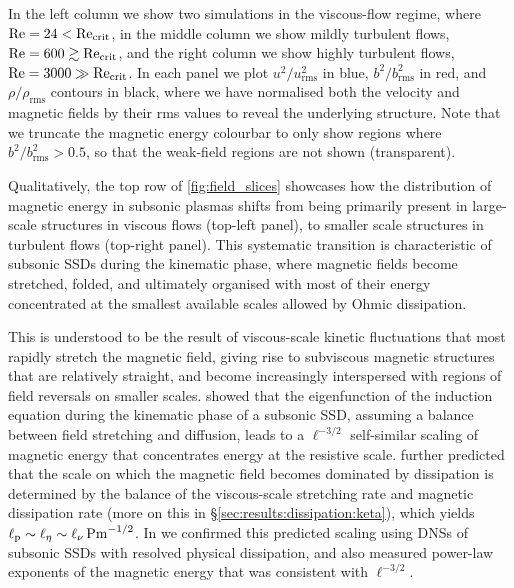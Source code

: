 In the left column we show two simulations in the viscous-flow regime, where $\mathrm{Re} = 24 < \mathrm{Re}_\mathrm{crit}$, in the middle column we show mildly turbulent flows, $\mathrm{Re} = 600 \gtrsim \mathrm{Re}_\mathrm{crit}$, and the right column we show highly turbulent flows, $\mathrm{Re} = 3000 \gg \mathrm{Re}_\mathrm{crit}$. In each panel we plot $u^2 / u_\mathrm{rms}^2$ in blue, $b^2/b_\mathrm{rms}^2$ in red, and $\rho/\rho_\mathrm{rms}$ contours in black, where we have normalised both the velocity and magnetic fields by their rms values to reveal the underlying structure. Note that we truncate the magnetic energy colourbar to only show regions where $b^2/b_\mathrm{rms}^2 > 0.5$, so that the weak-field regions are not shown (\ie transparent).

Qualitatively, the top row of \autoref{fig:field_slices} showcases how the distribution of magnetic energy in subsonic plasmas shifts from being primarily present in large-scale structures in viscous flows (top-left panel), to smaller scale structures in turbulent flows (top-right panel). This systematic transition is characteristic of subsonic SSDs during the kinematic phase, where magnetic fields become stretched, folded, and ultimately organised with most of their energy concentrated at the smallest available scales allowed by Ohmic dissipation.

This is understood to be the result of viscous-scale kinetic fluctuations that most rapidly stretch the magnetic field, giving rise to subviscous magnetic structures that are relatively straight, and become increasingly interspersed with regions of field reversals on smaller scales. \citet{kazantsev1968} showed that the eigenfunction of the induction equation during the kinematic phase of a subsonic SSD, assuming a balance between field stretching and diffusion, leads to a $\ell^{-3/2}$ self-similar scaling of magnetic energy that concentrates energy at the resistive scale. \citet{schekochihin2004simulations} further predicted that the scale on which the magnetic field becomes dominated by dissipation is determined by the balance of the viscous-scale stretching rate and magnetic dissipation rate (more on this in \S\ref{sec:results:dissipation:keta}), which yields $\ell_\mathrm{p} \sim \ell_\eta \sim \ell_\nu \,\mathrm{Pm}^{-1/2}$. In  we confirmed this predicted scaling using DNSs of subsonic SSDs with resolved physical dissipation, and also measured power-law exponents of the magnetic energy that was consistent with $\ell^{-3/2}$.

